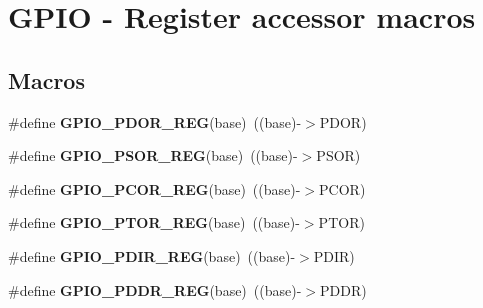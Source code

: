 \hypertarget{group___g_p_i_o___register___accessor___macros}{}\section{G\+P\+IO -\/ Register accessor macros}
\label{group___g_p_i_o___register___accessor___macros}
\subsection*{Macros}
\begin{DoxyCompactItemize}
\item 
\mbox{\label{group___g_p_i_o___register___accessor___macros_ga9a1866048e6b4643f38c8f1345b6ee60}} 
\#define {\bfseries G\+P\+I\+O\+\_\+\+P\+D\+O\+R\+\_\+\+R\+EG}(base)~((base)-\/$>$P\+D\+OR)
\item 
\mbox{\label{group___g_p_i_o___register___accessor___macros_gab745be6958ca2e22e2b475a611f473ca}} 
\#define {\bfseries G\+P\+I\+O\+\_\+\+P\+S\+O\+R\+\_\+\+R\+EG}(base)~((base)-\/$>$P\+S\+OR)
\item 
\mbox{\label{group___g_p_i_o___register___accessor___macros_ga97e0b9004936c347bd4728e34a5bd5cf}} 
\#define {\bfseries G\+P\+I\+O\+\_\+\+P\+C\+O\+R\+\_\+\+R\+EG}(base)~((base)-\/$>$P\+C\+OR)
\item 
\mbox{\label{group___g_p_i_o___register___accessor___macros_gac6579b41a85fbb464dacde9472ad7d83}} 
\#define {\bfseries G\+P\+I\+O\+\_\+\+P\+T\+O\+R\+\_\+\+R\+EG}(base)~((base)-\/$>$P\+T\+OR)
\item 
\mbox{\label{group___g_p_i_o___register___accessor___macros_ga2c24da45995f7a27504c3789daae14ce}} 
\#define {\bfseries G\+P\+I\+O\+\_\+\+P\+D\+I\+R\+\_\+\+R\+EG}(base)~((base)-\/$>$P\+D\+IR)
\item 
\mbox{\label{group___g_p_i_o___register___accessor___macros_ga61dac233f8be25e95cd419eb79714a07}} 
\#define {\bfseries G\+P\+I\+O\+\_\+\+P\+D\+D\+R\+\_\+\+R\+EG}(base)~((base)-\/$>$P\+D\+DR)

\end{DoxyCompactItemize}
